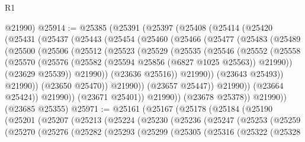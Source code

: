 \begin{lexlean}{R1}
\begin{coremodule}
      @21990)
@25914 := @25385
    (@25391
      (@25397
        (@25408
          (@25414
            (@25420
              (@25431
                (@25437
                  (@25443
                    (@25454
                      (@25460
                        (@25466
                          (@25477
                            (@25483
                              (@25489
                                (@25500
                                  (@25506
                                    (@25512
                                      (@25523
                                        (@25529
                                          (@25535
                                            (@25546
                                              (@25552
                                                (@25558
                                                  (@25570
                                                    (@25576
                                                      (@25582
                                                        (@25594 @25856 (@6827 @1025 @25563))
                                                        @21990))
                                                    (@23629 @25539))
                                                  @21990))
                                              (@23636 @25516))
                                            @21990))
                                        (@23643 @25493))
                                      @21990))
                                  (@23650 @25470))
                                @21990))
                            (@23657 @25447))
                          @21990))
                      (@23664 @25424))
                    @21990))
                (@23671 @25401))
              @21990))
          (@23678 @25378))
        @21990))
    (@23685 @25355)
@25971 := @25161
    (@25167
      (@25178
        (@25184
          (@25190
            (@25201
              (@25207
                (@25213
                  (@25224
                    (@25230
                      (@25236
                        (@25247
                          (@25253
                            (@25259
                              (@25270
                                (@25276
                                  (@25282
                                    (@25293
                                      (@25299
                                        (@25305
                                          (@25316
                                            (@25322
                                              (@25328

\end{coremodule}
\end{lexlean}
